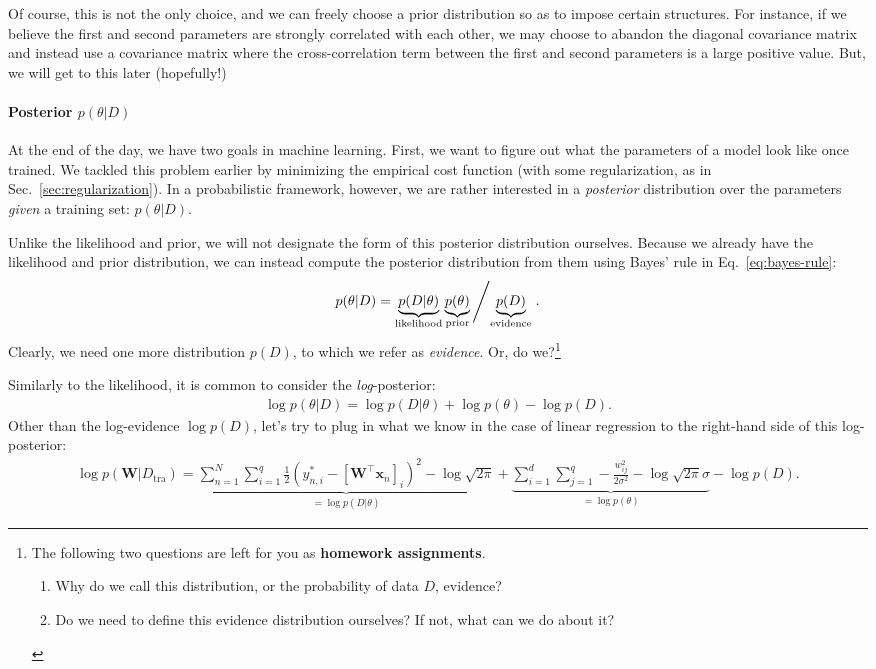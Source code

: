 \documentclass{report}
\newcommand{\vect}[1]{\mathbf{#1}}
\newcommand{\matr}[1]{\mathbf{#1}}
\newcommand{\vx}[0]{\vect{x}}
\newcommand{\mW}[0]{\matr{W}}
\newcommand{\tra}{\text{tra}}
\begin{document}
Of course, this is not the only choice, and we can freely
choose a prior distribution so as to impose certain structures. For instance, if
we believe the first and second parameters are strongly correlated with each
other, we may choose to abandon the diagonal covariance matrix and instead use a
covariance matrix where the cross-correlation term between the first and second
parameters is a large positive value. But, we will get to this later
(hopefully!)

\paragraph{Posterior $p(\theta | D)$}

At the end of the day, we have two goals in machine learning. First, we want to
figure out what the parameters of a model look like once trained. We tackled
this problem earlier by minimizing the empirical cost function (with some
regularization, as in Sec.~\ref{sec:regularization}). In a probabilistic
framework, however, we are rather interested in a {\it posterior} distribution
over the parameters {\it given} a training set: $p(\theta | D)$. 

Unlike the likelihood and prior, we will not designate the form of this
posterior distribution ourselves. Because we already have the likelihood and
prior distribution, we can instead compute the posterior distribution from them
using Bayes' rule in Eq.~\eqref{eq:bayes-rule}:
\begin{align*}
    p(\theta | D) = \underbrace{p(D|\theta)}_{\text{likelihood}}
    \underbrace{p(\theta)}_{\text{prior}}
    \left/
    \underbrace{p(D)}_{\text{evidence}}
    \right..
\end{align*}
Clearly, we need one more distribution $p(D)$, to which we refer as {\it
evidence}. Or, do we?\footnote{
    The following two questions are left for you as {\bf homework assignments}.
    \begin{enumerate}
        \item Why do we call this distribution, or the probability of data $D$,
            evidence? 
        \item Do we need to define this evidence distribution ourselves? If not,
            what can we do about it?
    \end{enumerate}
}

Similarly to the likelihood, it is common to consider the {\it log}-posterior:
\begin{align*}
    \log p(\theta | D) = \log p (D|\theta) + \log p(\theta) - \log p(D).
\end{align*}
Other than the log-evidence $\log p(D)$, let's try to plug in what we know in
the case of linear regression to the right-hand side of this log-posterior:
\begin{align*}
    \log p(\mW | D_{\tra}) = 
    \underbrace{
        \sum_{n=1}^N \sum_{i=1}^q 
        \frac{1}{2} (y^*_{n,i} - [\mW^\top \vx_n]_i )^2 
        - \log \sqrt{2\pi}
    }_{=\log p (D|\theta)}
    +
    \underbrace{
        \sum_{i=1}^{d} 
        \sum_{j=1}^{q}
        -\frac{ w_{ij}^2}{2\sigma^2} - \log \sqrt{2\pi}\sigma
    }_{=\log p(\theta)}
    - 
    \log p(D).
\end{align*}
\end{document}
